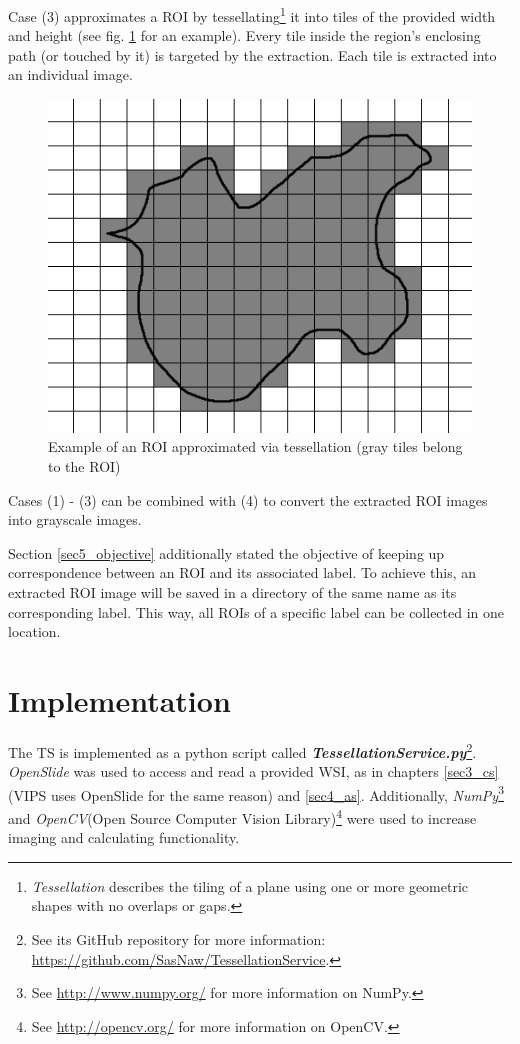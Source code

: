 Case (3) approximates a ROI by tessellating\footnote{
	\emph{Tessellation} describes the tiling of a plane using one or more geometric shapes with no overlaps or gaps\cite{Clifford09}.
} it into tiles of the provided width and height (see fig. \ref{fig5_tesExample} for an example). Every tile inside the region's enclosing path (or touched by it) is targeted by the extraction. Each tile is extracted into an individual image.

\begin{figure}[H]
	\begin{center}
		\includegraphics[scale=0.5]{img/tessellation.png}
		\caption{Example of an ROI approximated via tessellation (gray tiles belong to the ROI)}
		\label{fig5_tesExample}
	\end{center}
\end{figure}

Cases (1) - (3) can be combined with (4) to convert the extracted ROI images into grayscale images.

Section \ref{sec5_objective} additionally stated the objective of keeping up correspondence between an ROI and its associated label. To achieve this, an extracted ROI image will be saved in a directory of the same name as its corresponding label. This way, all ROIs of a specific label can be collected in one location.


\section{Implementation}
\label{sec5_impl}
The TS is implemented as a python script called \textbf{\emph{TessellationService.py}}\footnote{
	See its GitHub repository for more information: \url{https://github.com/SasNaw/TessellationService}.
}. \emph{OpenSlide} was used to access and read a provided WSI, as in chapters \ref{sec3_cs} (VIPS uses OpenSlide for the same reason\cite{cupitt96}) and \ref{sec4_as}. Additionally, \emph{NumPy}\footnote{
	See \url{http://www.numpy.org/} for more information on NumPy.
} and \emph{OpenCV}(Open Source Computer Vision Library)\footnote{
	See \url{http://opencv.org/} for more information on OpenCV.
} were used to increase imaging and calculating functionality.

